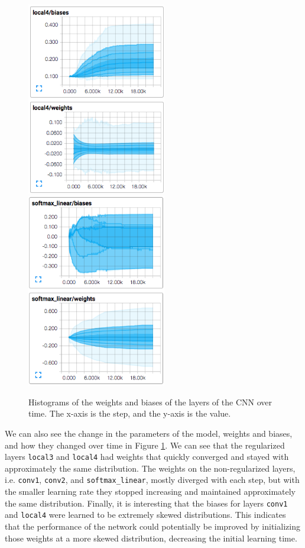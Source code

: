 \documentclass[10pt, twocolumn, twoside]{article}
\begin{document}
\begin{figure}
	\includegraphics[width=2.4in]{local4_params}
	\includegraphics[width=2.4in]{softmax_params}
	\caption{Histograms of the weights and biases of the layers of the CNN over time. The x-axis is the step, and the y-axis is the value.}
	\label{fig:params}
\end{figure}


We can also see the change in the parameters of the model, weights and biases, and how they changed over time in Figure \ref{fig:params}. We can see that the regularized layers \texttt{local3} and \texttt{local4} had weights that quickly converged and stayed with approximately the same distribution. The weights on the non-regularized layers, i.e. \texttt{conv1}, \texttt{conv2}, and \texttt{softmax\_linear}, mostly diverged with each step, but with the smaller learning rate they stopped increasing and maintained approximately the same distribution. Finally, it is interesting that the biases for layers \texttt{conv1} and \texttt{local4} were learned to be extremely skewed distributions. This indicates that the performance of the network could potentially be improved by initializing those weights at a more skewed distribution, decreasing the initial learning time.
\end{document}
